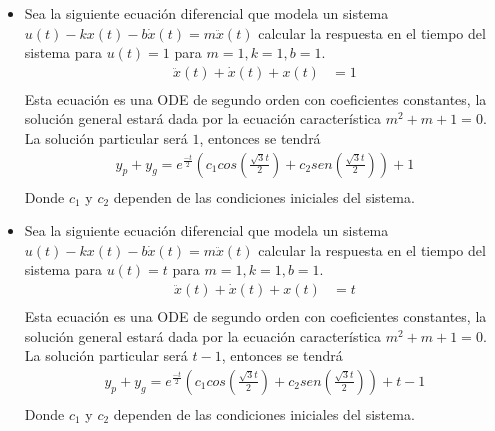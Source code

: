 \documentclass[12pt]{article}
\begin{document}
\begin{itemize}
    \item Sea la siguiente ecuación diferencial que modela un sistema $u(t)-kx(t)-b\dot{x}(t)=m\ddot{x}(t)$ calcular la respuesta en el tiempo del sistema para $u(t)=1$ para $m=1,k=1,b=1$.
    \begin{equation}
        \begin{split}
            \ddot{x}(t)+\dot{x}(t)+x(t)&=1\\
            \label{eq:ode3}
        \end{split}
    \end{equation}
    Esta ecuación es una ODE de segundo orden con coeficientes constantes, la solución general estará dada por la ecuación característica $m^2+m+1=0$.
    La solución particular será $1$, entonces se tendrá
    \begin{equation}
        \begin{split}
            y_{p}+y_{g}=e^{\frac{-t}{2}}(c_{1}cos(\frac{\sqrt{3}t}{2})+c_{2}sen(\frac{\sqrt{3}t}{2}))+1\\
            \label{eq:ode31}
        \end{split}
    \end{equation}
    Donde $c_{1}$ y $c_{2}$ dependen de las condiciones iniciales del sistema.

    \item Sea la siguiente ecuación diferencial que modela un sistema $u(t)-kx(t)-b\dot{x}(t)=m\ddot{x}(t)$ calcular la respuesta en el tiempo del sistema para $u(t)=t$ para $m=1,k=1,b=1$.
    \begin{equation}
        \begin{split}
            \ddot{x}(t)+\dot{x}(t)+x(t)&=t\\
            \label{eq:ode4}
        \end{split}
    \end{equation}
    Esta ecuación es una ODE de segundo orden con coeficientes constantes, la solución general estará dada por la ecuación característica $m^2+m+1=0$.
    La solución particular será $t-1$, entonces se tendrá
    \begin{equation}
        \begin{split}
            y_{p}+y_{g}=e^{\frac{-t}{2}}(c_{1}cos(\frac{\sqrt{3}t}{2})+c_{2}sen(\frac{\sqrt{3}t}{2}))+t-1\\
            \label{eq:ode41}
        \end{split}
    \end{equation}
    Donde $c_{1}$ y $c_{2}$ dependen de las condiciones iniciales del sistema.
\end{itemize}
\end{document}
